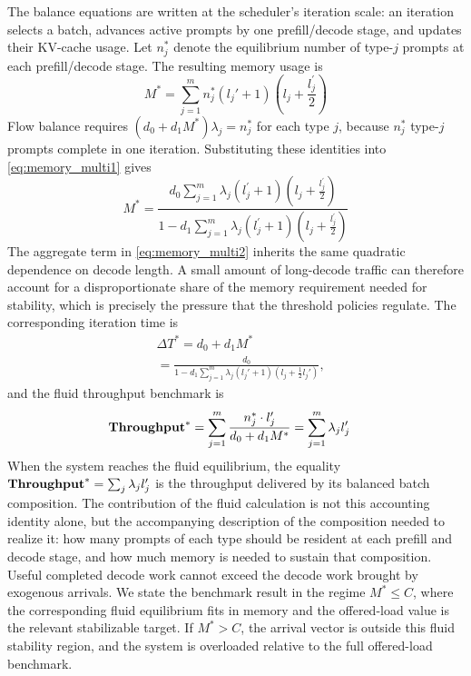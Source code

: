 The balance equations are written at the scheduler's iteration scale: an iteration selects a batch, advances active prompts by one prefill/decode stage, and updates their KV-cache usage. Let \(n_j^*\) denote the equilibrium number of type-\(j\) prompts at each prefill/decode stage. The resulting memory usage is
\begin{equation}
\label{eq:memory_multi1}
    M^* = \sum_{j=1}^m n_j^*(l_j'+1)\left(l_j + \frac{l_j^\prime}{2}\right)
\end{equation}
Flow balance requires \((d_0+d_1M^*)\lambda_j = n_j^*\) for each type \(j\), because \(n_j^*\) type-\(j\) prompts complete in one iteration. Substituting these identities into \eqref{eq:memory_multi1} gives
\begin{equation}
\label{eq:memory_multi2}
M^* = \frac{d_0\sum_{j=1}^m \lambda_j (l_j^{\prime}+1)\left(l_j + \frac{l_j^{\prime}}{2} \right)}{1-d_1\sum_{j=1}^m \lambda_j (l_j^{\prime}+1)\left(l_j + \frac{l_j^{\prime}}{2} \right) } 
\end{equation}
The aggregate term in \eqref{eq:memory_multi2} inherits the same quadratic dependence on decode length. A small amount of long-decode traffic can therefore account for a disproportionate share of the memory requirement needed for stability, which is precisely the pressure that the threshold policies regulate.
The corresponding iteration time is
\begin{equation}    \label{eq:time_fluid}
    \begin{aligned}
            &\Delta T^* = d_0 + d_1 M^*  \\
                  &= \frac{d_0}{1 - d_1 \sum_{j=1}^m \lambda_j (l_j' + 1)(l_j + \tfrac{1} {2}l_j')},
    \end{aligned}
\end{equation}
and the fluid throughput benchmark is
\begin{equation}
    \label{throughput_fluid_multiple}
    \begin{aligned}
        &\textbf{Throughput}^*
        = \sum_{j=1}^m \frac{n_j^* \cdot l_j^{\prime}}{d_0 + d_1 M^*}
        = \sum_{j=1}^m \lambda_j l_j^{\prime}
    \end{aligned}
\end{equation}
When the system reaches the fluid equilibrium, the equality \(\textbf{Throughput}^*=\sum_j\lambda_jl'_j\) is the throughput delivered by its balanced batch composition. The contribution of the fluid calculation is not this accounting identity alone, but the accompanying description of the composition needed to realize it: how many prompts of each type should be resident at each prefill and decode stage, and how much memory is needed to sustain that composition. Useful completed decode work cannot exceed the decode work brought by exogenous arrivals. We state the benchmark result in the regime \(M^*\le C\), where the corresponding fluid equilibrium fits in memory and the offered-load value is the relevant stabilizable target. If \(M^*>C\), the arrival vector is outside this fluid stability region, and the system is overloaded relative to the full offered-load benchmark.

